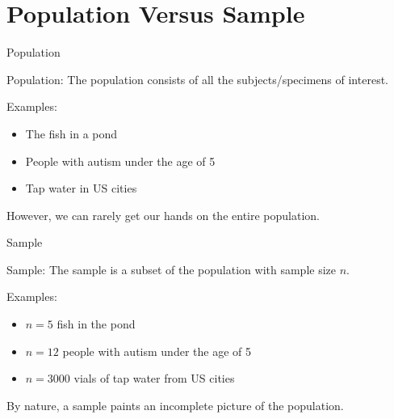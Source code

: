\documentclass{beamer}
\begin{document}





\section{Population Versus Sample}

\begin{frame}{Population}
\begin{block}{Population:} The population consists of all the subjects/specimens of interest.\end{block}

Examples:
\begin{itemize}
  \item The fish in a pond
  \item People with autism under the age of 5
  \item Tap water in US cities
\end{itemize}

\pause 

However, we can rarely get our hands on the entire population.
\end{frame}

\begin{frame}{Sample}
\begin{block}{Sample:} The sample is a subset of the population with sample size $n$.\end{block}


Examples:
\begin{itemize}
  \item $n=5$ fish in the pond
  \item $n=12$ people with autism under the age of 5
  \item $n=3000$ vials of tap water from US cities
\end{itemize}

\pause

By nature, a sample paints an incomplete picture of the population. 
\end{frame}

\end{document}
